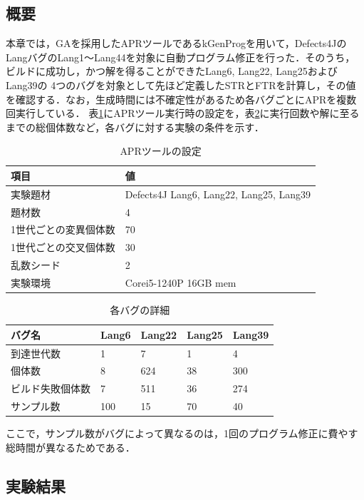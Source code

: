 \documentclass[uplatex,dvipdfmx,a4paper]{jsarticle}
\let\oldcite\cite
\renewcommand{\cite}[1]{\xspace\oldcite{#1}}
\begin{document}
\subsection{概要}
本章では，GAを採用したAPRツールであるkGenProg\cite{higo2018kgenprog}を用いて，Defects4J\cite{just2014defects4j}のLangバグのLang1～Lang44を対象に自動プログラム修正を行った．そのうち，ビルドに成功し，かつ解を得ることができたLang6, 
 Lang22, Lang25およびLang39の
4つのバグを対象として先ほど定義したSTRとFTRを計算し，その値を確認する．なお，生成時間には不確定性があるため各バグごとにAPRを複数回実行している．
表\ref{tab:apr_setting}にAPRツール実行時の設定を，表\ref{tab:project_setting}に実行回数や解に至るまでの総個体数など，各バグに対する実験の条件を示す．
\begin{table}[b]
  \centering
  \caption{APRツールの設定}
  \label{tab:apr_setting}
  \begin{tabular}{ll} \hline\hline
    項目         & 値                           \\\hline
    実験題材     & Defects4J Lang6, Lang22, Lang25, Lang39 \\
    題材数       & 4                           \\
    1世代ごとの変異個体数 & 70 \\
    1世代ごとの交叉個体数 & 30 \\
    乱数シード   & 2       \\
    実験環境     & Corei5-1240P 16GB mem  \\\hline\hline
  \end{tabular}
\end{table}
\begin{table}[b]
  \centering
  \caption{各バグの詳細}
  \label{tab:project_setting}
  \begin{tabular}{lllll} \hline\hline
    バグ名 & Lang6 & Lang22 & Lang25 & Lang39  \\\hline
    到達世代数 & 1 & 7 & 1 & 4 \\
    個体数 & 8 & 624 & 38 & 300 \\
    ビルド失敗個体数 & 7 & 511 & 36 & 274 \\
    サンプル数 & 100 & 15 & 70 & 40 \\\hline\hline
  \end{tabular}
\end{table}
ここで，サンプル数がバグによって異なるのは，1回のプログラム修正に費やす総時間が異なるためである．
\subsection{実験結果}
\end{document}
